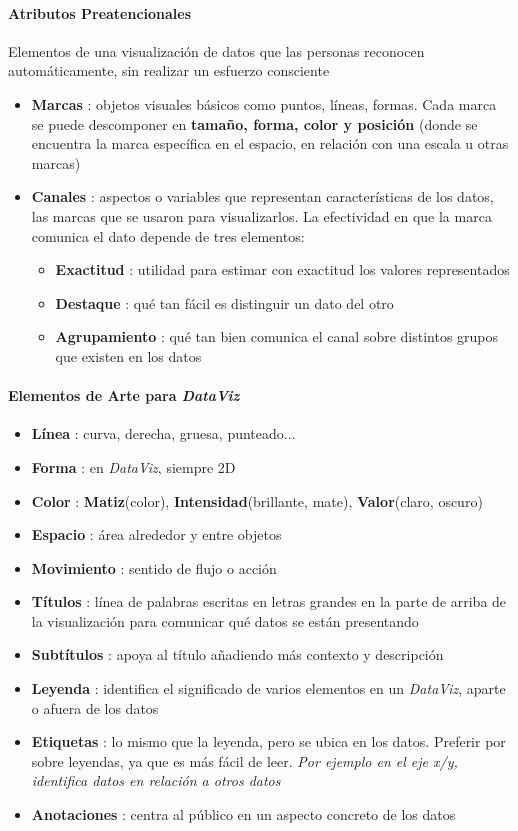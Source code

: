 \paragraph{Atributos Preatencionales}
Elementos de una visualización de datos que las personas reconocen automáticamente, sin realizar un esfuerzo consciente
\begin{itemize}
    \item {\textbf{Marcas} : objetos visuales básicos como puntos, líneas, formas. Cada marca se puede descomponer en \textbf{tamaño, forma, color y posición} (donde se encuentra la marca específica en el espacio, en relación con una escala u otras marcas)}
    \item {\textbf{Canales} : aspectos o variables que representan características de los datos, las marcas que se usaron para visualizarlos. La efectividad en que la marca comunica el dato depende de tres elementos:
    \begin{itemize}
        \item {\textbf{Exactitud} : utilidad para estimar con exactitud los valores representados}
        \item {\textbf{Destaque} : qué tan fácil es distinguir un dato del otro}
        \item {\textbf{Agrupamiento} : qué tan bien comunica el canal sobre distintos grupos que existen en los datos}
    \end{itemize}}
\end{itemize}

\paragraph{Elementos de Arte para \textit{DataViz}}
\begin{itemize}
    \item {\textbf{Línea} : curva, derecha, gruesa, punteado...}
    \item {\textbf{Forma} : en \textit{DataViz}, siempre 2D}
    \item {\textbf{Color} : \textbf{Matiz}(color), \textbf{Intensidad}(brillante, mate), \textbf{Valor}(claro, oscuro)}
    \item {\textbf{Espacio} : área alrededor y entre objetos}
    \item {\textbf{Movimiento} : sentido de flujo o acción}
    \item {\textbf{Títulos} : línea de palabras escritas en letras grandes en la parte de arriba de la visualización para comunicar qué datos se están presentando}
    \item {\textbf{Subtítulos} : apoya al título añadiendo más contexto y descripción}
    \item {\textbf{Leyenda} : identifica el significado de varios elementos en un \textit{DataViz}, aparte o afuera de los datos}
    \item {\textbf{Etiquetas} : lo mismo que la leyenda, pero se ubica en los datos. Preferir por sobre leyendas, ya que es más fácil de leer. \textit{Por ejemplo en el eje x/y, identifica datos en relación a otros datos}}
    \item {\textbf{Anotaciones} : centra al público en un aspecto concreto de los datos}
\end{itemize}

